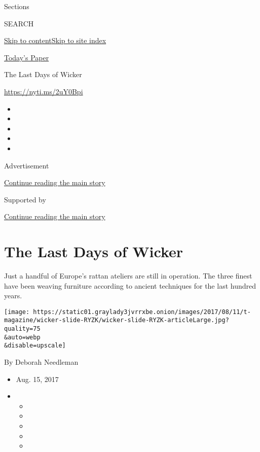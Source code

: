 Sections

SEARCH

\protect\hyperlink{site-content}{Skip to
content}\protect\hyperlink{site-index}{Skip to site index}

\href{https://myaccount.nytimes3xbfgragh.onion/auth/login?response_type=cookie\&client_id=vi}{}

\href{https://www.nytimes3xbfgragh.onion/section/todayspaper}{Today's
Paper}

The Last Days of Wicker

\url{https://nyti.ms/2uY0Bpi}

\begin{itemize}
\item
\item
\item
\item
\item
\end{itemize}

Advertisement

\protect\hyperlink{after-top}{Continue reading the main story}

Supported by

\protect\hyperlink{after-sponsor}{Continue reading the main story}

\hypertarget{the-last-days-of-wicker}{%
\section{The Last Days of Wicker}\label{the-last-days-of-wicker}}

Just a handful of Europe's rattan ateliers are still in operation. The
three finest have been weaving furniture according to ancient techniques
for the last hundred years.

\texttt{[image: https://static01.graylady3jvrrxbe.onion/images/2017/08/11/t-magazine/wicker-slide-RYZK/wicker-slide-RYZK-articleLarge.jpg?quality=75\\\&auto=webp\\\&disable=upscale]}

By Deborah Needleman

\begin{itemize}
\item
  Aug. 15, 2017
\item
  \begin{itemize}
  \item
  \item
  \item
  \item
  \item
  \end{itemize}
\end{itemize}

